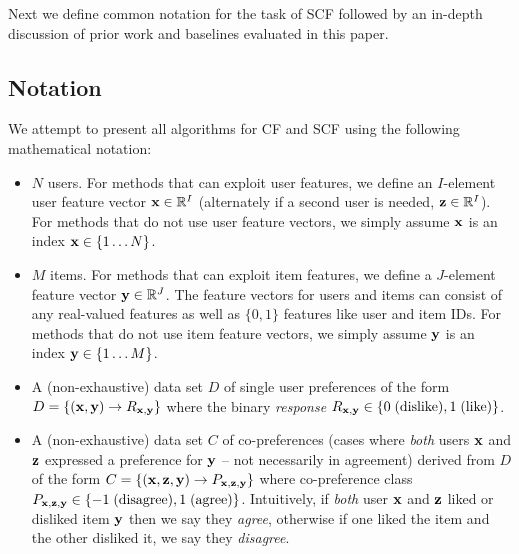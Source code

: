 Next we define common notation for the
task of SCF 
followed by an in-depth discussion of prior work and baselines
evaluated in this paper.

\subsection{Notation}

We attempt to present all algorithms for CF and SCF using the following
mathematical notation:
\begin{itemize}
\item $N$ users.  For methods that can exploit user features, we define 
an $I$-element user feature vector 
$\mathbf{x} \in \mathbb{R}^I$ (alternately if a second user is needed, $\mathbf{z} \in \mathbb{R}^I$).
For methods that do not use user feature vectors, we simply assume $\mathbf{x}$
is an index $\mathbf{x} \in \{ 1 \ldots N \}$.%

\item $M$ items.  For methods that can exploit item features, we define
a $J$-element feature vector 
$\mathbf{y} \in \mathbb{R}^J$. The feature vectors for users 
and items can consist of any real-valued features as well as $\{0,1\}$
features like user and item IDs.
For methods that do not use item feature vectors, we simply assume $\mathbf{y}$
is an index $\mathbf{y} \in \{ 1 \ldots M \}$.%

\item A (non-exhaustive) data set $D$ of single user preferences of the form
$D = \{ (\mathbf{x}, \mathbf{y}) \to R_{\mathbf{x},\mathbf{y}} \}$ where 
the binary \emph{response} 
$R_{\mathbf{x},\mathbf{y}} \in \{ 0 \; \mbox{(dislike)}, 1 \; \mbox{(like)} \}$.

\item A (non-exhaustive) data set $C$ of co-preferences (cases where
\emph{both} users $\mathbf{x}$ and $\mathbf{z}$ expressed a preference for $\mathbf{y}$ -- not
necessarily in agreement) derived from $D$ of the form
$C = \{ (\mathbf{x}, \mathbf{z}, \mathbf{y}) \to P_{\mathbf{x}, \mathbf{z}, \mathbf{y}} \}$ where co-preference class 
$P_{\mathbf{x}, \mathbf{z}, \mathbf{y}} \in \{ -1 \; \mbox{(disagree)}, 1 \;\mbox{(agree)} \}$.  
Intuitively, if \emph{both} user $\mathbf{x}$ and $\mathbf{z}$ liked or disliked item 
$\mathbf{y}$ then we say they \emph{agree}, otherwise if one liked the item and
the other disliked it, we say they \emph{disagree}.


\end{itemize}
